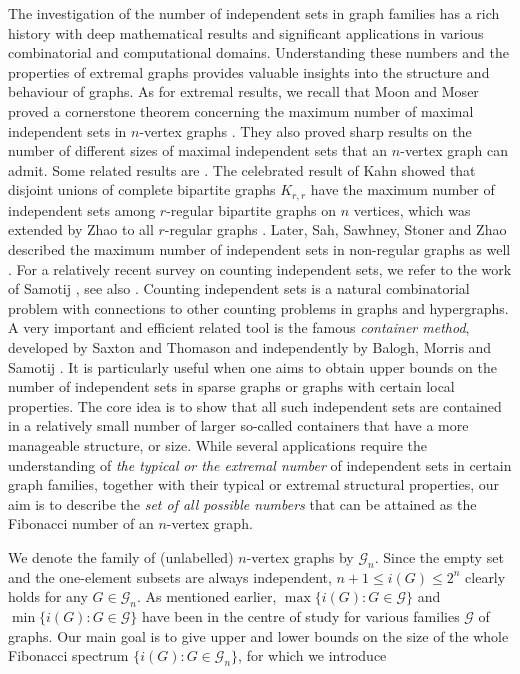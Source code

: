 \documentclass[10pt,a4paper]{article}
\numberwithin{equation}{section}
\newcommand{\cG}{\mathcal{G}}
\begin{document}
The investigation of  the number of independent sets in  graph families has a rich history with deep mathematical results and significant applications in various combinatorial and computational domains. Understanding these numbers and the properties of extremal graphs provides valuable insights into the structure and behaviour of graphs.
As for extremal results, we recall that  Moon and Moser proved a cornerstone theorem concerning the maximum number  of maximal independent sets in $n$-vertex graphs \cite{MM}. They also proved sharp results on the number of different sizes of maximal independent sets that an $n$-vertex graph can admit. Some related results are \cite{Erdos, NZL, Spencer, Wood}. The celebrated result of Kahn \cite{Kahn} showed that disjoint unions of complete bipartite graphs $K_{r,r}$ have the maximum number of independent sets among $r$-regular bipartite graphs on $n$ vertices, which was  extended by Zhao  to all
$r$-regular graphs \cite{Zhao}. Later, Sah, Sawhney, Stoner and Zhao described the maximum  number of independent sets in  non-regular graphs as well \cite{Sah}. 
For a relatively recent survey on counting independent sets, we refer to the work of Samotij \cite{Samotij}, see also \cite{ Mink, Cutler, DJPR}. 
Counting independent sets is a natural combinatorial problem with connections to other counting problems in graphs and hypergraphs. A very important and efficient related tool is the famous \textit{container method}, developed by  Saxton and Thomason \cite{Container2} and independently by Balogh, Morris and Samotij \cite{Container1}. It is
particularly useful when one aims to obtain upper bounds on the number of independent sets in sparse graphs or graphs with certain local properties. The core idea is to show that all such independent sets are contained in a relatively small number of larger so-called containers that have a more manageable structure, or size. 
While several applications require the understanding of \textit{the typical} \textit{or the extremal number} of independent sets in certain graph families, together with their typical or extremal structural properties, our aim is to describe the\textit{ set of all possible numbers} that can be attained as the Fibonacci number of an $n$-vertex graph.

We denote the family of (unlabelled) $n$-vertex graphs by $\cG_n$.
Since the empty set and the one-element subsets are always independent, $n+1\le i(G)\le 2^n$ clearly holds for any $G\in \cG_n$. As mentioned earlier, $\max\{ i(G): G\in \cG\}$ and $\min\{ i(G): G\in \cG\}$ have been in the centre of study for various families $\cG$ of graphs.
Our main goal is to give upper and lower bounds on the size of the whole Fibonacci spectrum 
$\{ i(G): G\in \cG_n\}$, for which we introduce
\end{document}
